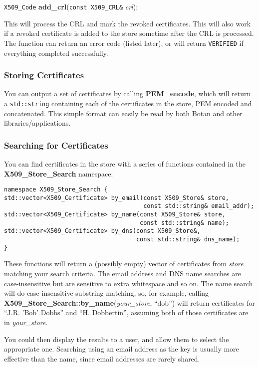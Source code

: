 \documentclass{article}
\newcommand{\function}[1]{\textbf{#1}}
\newcommand{\type}[1]{\texttt{#1}}
\renewcommand{\arg}[1]{\textsl{#1}}
\begin{document}
\type{X509\_Code} \function{add\_crl}(\type{const X509\_CRL\&} \arg{crl});

This will process the CRL and mark the revoked certificates. This will also
work if a revoked certificate is added to the store sometime after the CRL is
processed. The function can return an error code (listed later), or will return
\type{VERIFIED} if everything completed successfully.

\subsubsection{Storing Certificates}

You can output a set of certificates by calling \function{PEM\_encode}, which
will return a \type{std::string} containing each of the certificates in the
store, PEM encoded and concatenated. This simple format can easily be read by
both Botan and other libraries/applications.

\pagebreak

\subsubsection{Searching for Certificates}

You can find certificates in the store with a series of functions contained
in the \function{X509\_Store\_Search} namespace:

\begin{verbatim}
namespace X509_Store_Search {
std::vector<X509_Certificate> by_email(const X509_Store& store,
                                       const std::string& email_addr);
std::vector<X509_Certificate> by_name(const X509_Store& store,
                                      const std::string& name);
std::vector<X509_Certificate> by_dns(const X509_Store&,
                                     const std::string& dns_name);
}
\end{verbatim}

These functions will return a (possibly empty) vector of certificates from
\arg{store} matching your search criteria. The email address and DNS name
searches are case-insensitive but are sensitive to extra whitespace and so
on. The name search will do case-insensitive substring matching, so, for
example, calling \function{X509\_Store\_Search::by\_name}(\arg{your\_store},
``dob'') will return certificates for ``J.R. 'Bob' Dobbs'' and
``H. Dobbertin'', assuming both of those certificates are in \arg{your\_store}.

You could then display the results to a user, and allow them to select the
appropriate one. Searching using an email address as the key is usually more
effective than the name, since email addresses are rarely shared.
\end{document}
